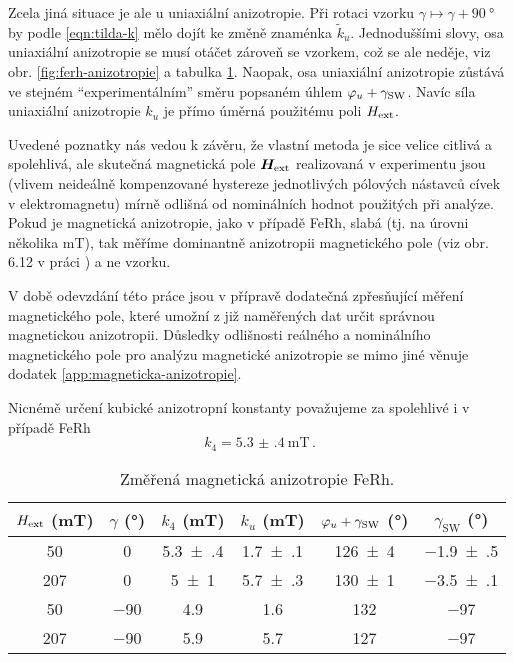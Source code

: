 Zcela jiná situace je ale u uniaxiální anizotropie.
Při rotaci vzorku $\gamma \mapsto\gamma+\SI{90}{\degree}$ by podle \eqref{eqn:tilda-k} mělo dojít ke změně znaménka $\tilde{k}_u$.
Jednoduššími slovy, osa uniaxiální anizotropie se musí otáčet zároveň se vzorkem, což se ale neděje, viz obr. \ref{fig:ferh-anizotropie} a tabulka \ref{tab:ferh-anizotropie}.
Naopak, osa uniaxiální anizotropie zůstává ve stejném ``experimentálním'' směru popsaném úhlem $\varphi_u+\gamma_\textrm{SW}$.
Navíc síla uniaxiální anizotropie $k_u$ je přímo úměrná použitému poli $H_\textrm{ext}$.

Uvedené poznatky nás vedou k závěru, že vlastní metoda je sice velice citlivá a spolehlivá, ale skutečná magnetická pole $\bm{H}_\textrm{ext}$ realizovaná v experimentu jsou (vlivem neideálně kompenzované hystereze jednotlivých pólových nástavců cívek v elektromagnetu) mírně odlišná od nominálních hodnot použitých při analýze.
Pokud je magnetická anizotropie, jako v případě FeRh, slabá (tj. na úrovni několika \si{\milli\tesla}), tak měříme dominantně anizotropii magnetického pole (viz obr. 6.12 v práci \cite{kimakOptickaSpektroskopieAntiferomagnetu2019}) a ne vzorku.

V době odevzdání této práce jsou v přípravě dodatečná zpřesňující měření magnetického pole, které umožní z již naměřených dat určit správnou magnetickou anizotropii.
Důsledky odlišnosti reálného a nominálního magnetického pole pro analýzu magnetické anizotropie se mimo jiné věnuje dodatek \ref{app:magneticka-anizotropie}.

Nicnémě určení kubické anizotropní konstanty považujeme za spolehlivé i v případě FeRh
\begin{equation}
    k_4=\SI{5.3(4)}{\milli\tesla} \,.
\end{equation}

\begin{table}[tp]
    \centering
    \begin{tabular}{cc|cccc}
        \toprule
        $H_\textrm{ext}$ (\si{\milli\tesla}) & $\gamma$ (\si{\degree}) & $k_4$ (\si{\milli\tesla}) & $k_u$ (\si{\milli\tesla}) & $\varphi_u+\gamma_\textrm{SW}$ (\si{\degree}) & $\gamma_\textrm{SW}$ (\si{\degree}) \\ \midrule[\heavyrulewidth]
        50 & 0 & \num{5.3(4)} & \num{1.7(1)} & \num{126(4)} & \num{-1.9(5)} \\
        207 & 0 & \num{5(1)} & \num{5.7(3)} & \num{130(1)} & \num{-3.5(1)} \\ \midrule[\heavyrulewidth]
        50 & \num{-90} & \num{4.9} & \num{1.6} & \num{132} & \num{-97} \\
        207 & \num{-90} & \num{5.9} & \num{5.7} & \num{127} & \num{-97} \\
        \bottomrule 
    \end{tabular} 
    \caption{Změřená magnetická anizotropie FeRh.}
    \label{tab:ferh-anizotropie}
\end{table}


